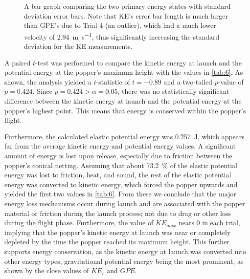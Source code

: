\documentclass[reprint,amsmath,amssymb,aps,twoside]{revtex4-2} %
\begin{document}
\begin{figure}
\begin{center}

\end{center}
\caption{A bar graph comparing the two primary energy states with standard deviation error bars. Note that KE’s error bar length is much larger than GPE’s due to Trial 4 (an outlier), which had a much lower velocity of \qty{2.94}{\meter\per\second}, thus significantly increasing the standard deviation for the KE measurements.}
\label{fig:8}
\end{figure}

A paired $t$-test was performed to compare the kinetic energy at launch and the potential energy at the popper’s maximum height with the values in \cref{tab:6}. As shown, the analysis yielded a $t$-statistic of $t = -0.89$ and a two-tailed $p$-value of $p = 0.424$. Since $p = 0.424 > \alpha = 0.05$, there was no statistically significant difference between the kinetic energy at launch and the potential energy at the popper’s highest point. This means that energy is conserved within the popper’s flight. 

Furthermore, the calculated elastic potential energy was \qty{0.257}{\joule}, which appears far from the average kinetic energy and potential energy values. A significant amount of energy is lost upon release, especially due to friction between the popper’s conical netting. Assuming that about \qty{73.2}{\percent} of the elastic potential energy was lost to friction, heat, and sound, the rest of the elastic potential energy was converted to kinetic energy, which forced the popper upwards and yielded the first two values in \cref{tab:6}. From these we conclude that the major energy loss mechanisms occur during launch and are associated with the popper material or friction during the launch process; not due to drag or other loss during the flight phase. Furthermore, the value of $KE_{max}$ nears 0 in each trial, implying that the popper’s kinetic energy at launch was near or completely depleted by the time the popper reached its maximum height. This further supports energy conservation, as the kinetic energy at launch was converted into other energy types, gravitational potential energy being the most prominent, as shown by the close values of $KE_r$ and $GPE$.

\end{document}
